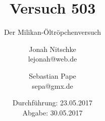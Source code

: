 

\title{Versuch 503}
\subtitle{Der Milikan-Öltröpchenversuch}
\author{Jonah Nitschke\\
        lejonah@web.de \and
        Sebastian Pape\\
        sepa@gmx.de}
\date{Durchführung: 23.05.2017\\
      Abgabe: 30.05.2017}



\maketitle
\newpage
\setcounter{page}{1}


\newpage


\newpage

\printbibliography


